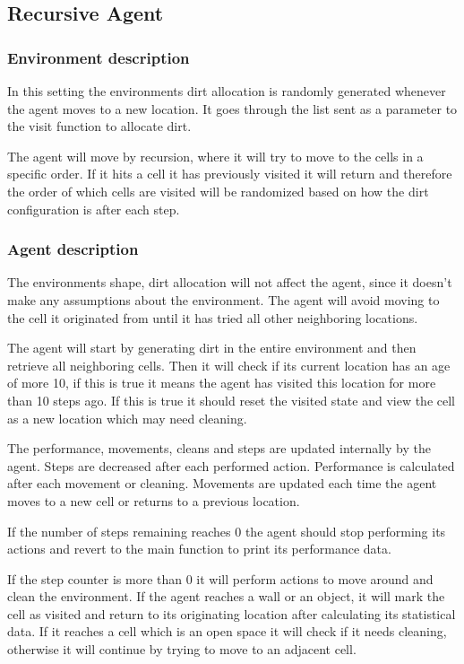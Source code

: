 \subsection{Recursive Agent}
\subsubsection{Environment description}
In this setting the environments dirt allocation is randomly generated whenever
the agent moves to a new location.  It goes through the list sent as a parameter
to the visit function to allocate dirt.

The agent will move by recursion, where it will try to move to the cells in a
specific order. If it hits a cell it has previously visited it will return and
therefore the order of which cells are visited will be randomized based on how
the dirt configuration is after each step.

\subsubsection{Agent description}
The environments shape, dirt allocation will not affect the agent, since it
doesn't make any assumptions about the environment. The agent will avoid moving
to the cell it originated from until it has tried all other neighboring
locations.

The agent will start by generating dirt in the entire environment and then
retrieve all neighboring cells.  Then it will check if its current location has
an age of more 10, if this is true it means the agent has visited this location
for more than 10 steps ago.  If this is true it should reset the visited state
and view the cell as a new location which may need cleaning.

The performance, movements, cleans and steps are updated internally by the
agent. Steps are decreased after each performed action. Performance is
calculated after each movement or cleaning. Movements are updated each time the
agent moves to a new cell or returns to a previous location.

If the number of steps remaining reaches 0 the agent should stop performing its
actions and revert to the main function to print its performance data.

If the step counter is more than 0 it will perform actions to move around and
clean the environment.  If the agent reaches a wall or an object, it will mark
the cell as visited and return to its originating location after calculating its
statistical data.  If it reaches a cell which is an open space it will check if
it needs cleaning, otherwise it will continue by trying to move to an adjacent
cell.

